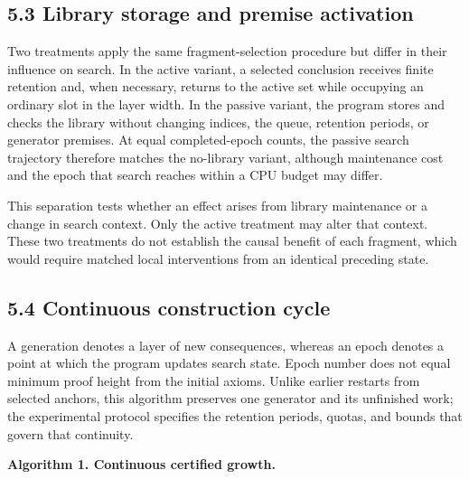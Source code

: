 \documentclass[pdflatex,sn-basic,Numbered]{sn-jnl}
\begin{document}
\subsection*{5.3 Library storage and premise activation}\label{library-storage-and-premise-activation}

Two treatments apply the same fragment-selection procedure but differ in their influence on search. In the active variant, a selected conclusion receives finite retention and, when necessary, returns to the active set while occupying an ordinary slot in the layer width. In the passive variant, the program stores and checks the library without changing indices, the queue, retention periods, or generator premises. At equal completed-epoch counts, the passive search trajectory therefore matches the no-library variant, although maintenance cost and the epoch that search reaches within a CPU budget may differ.

This separation tests whether an effect arises from library maintenance or a change in search context. Only the active treatment may alter that context. These two treatments do not establish the causal benefit of each fragment, which would require matched local interventions from an identical preceding state.

\subsection*{5.4 Continuous construction cycle}\label{continuous-construction-cycle}

A generation denotes a layer of new consequences, whereas an epoch denotes a point at which the program updates search state. Epoch number does not equal minimum proof height from the initial axioms. Unlike earlier restarts from selected anchors, this algorithm preserves one generator and its unfinished work; the experimental protocol specifies the retention periods, quotas, and bounds that govern that continuity.

\textbf{Algorithm 1. Continuous certified growth.}
\end{document}
